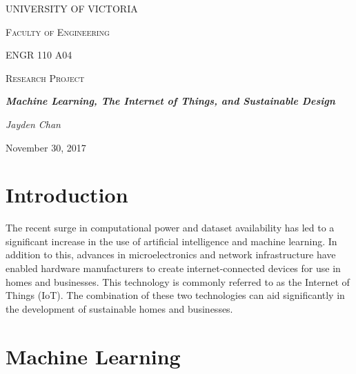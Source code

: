 \documentclass[letterpaper]{article}
\begin{document}
\begin{titlepage}
    \centering
    {\scshape\huge UNIVERSITY OF VICTORIA \par}
    \vspace{1cm}
    {\scshape\LARGE Faculty of Engineering \par\Large ENGR 110 A04\par}
    \vspace{1cm}
    {\scshape\Large Research Project \par}
    \vspace{1.5cm}
    {\huge\bfseries \emph{Machine Learning, The Internet of Things, and Sustainable Design} \par}
    \vspace{2cm}
    {\Large\itshape Jayden Chan \par}
    \vfill
    {\large November 30, 2017\par}
\end{titlepage}

\pagestyle{pageOne}
\section{Introduction}
The recent surge in computational power and dataset availability has led to a significant increase in the use of artificial intelligence and machine learning. In addition to this, advances in microelectronics and network infrastructure have enabled hardware manufacturers to create internet-connected devices for use in homes and businesses. This technology is commonly referred to as the Internet of Things (IoT). The combination of these two technologies can aid significantly in the development of sustainable homes and businesses. 

\section{Machine Learning}
\blindtext

\printbibliography
\end{document}
